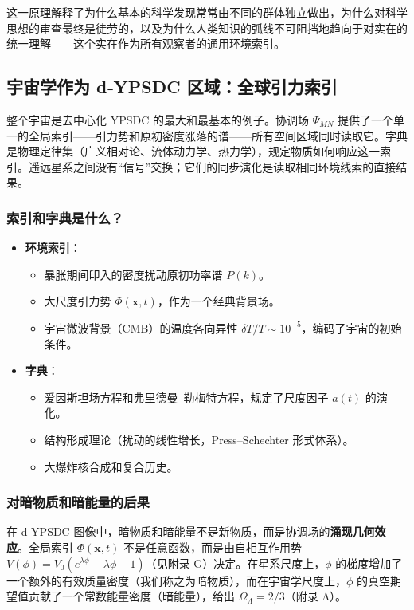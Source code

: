 \documentclass[11pt,a4paper]{article}
\begin{document}
	这一原理解释了为什么基本的科学发现常常由不同的群体独立做出，为什么对科学思想的审查最终是徒劳的，以及为什么人类知识的弧线不可阻挡地趋向于对实在的统一理解——这个实在作为所有观察者的通用环境索引。
	
	\subsection{宇宙学作为 d‑YPSDC 区域：全球引力索引}
	\label{subsec:cosmology-dypsdc}
	
	整个宇宙是去中心化 YPSDC 的最大和最基本的例子。协调场 \(\Psi_{MN}\) 提供了一个单一的全局索引——引力势和原初密度涨落的谱——所有空间区域同时读取它。字典是物理定律集（广义相对论、流体动力学、热力学），规定物质如何响应这一索引。遥远星系之间没有“信号”交换；它们的同步演化是读取相同环境线索的直接结果。
	
	\subsubsection*{索引和字典是什么？}
	\begin{itemize}[leftmargin=*]
		\item \textbf{环境索引}：
		\begin{itemize}
			\item 暴胀期间印入的密度扰动原初功率谱 \(P(k)\)。
			\item 大尺度引力势 \(\Phi(\mathbf{x},t)\)，作为一个经典背景场。
			\item 宇宙微波背景（CMB）的温度各向异性 \(\delta T / T \sim 10^{-5}\)，编码了宇宙的初始条件。
		\end{itemize}
		\item \textbf{字典}：
		\begin{itemize}
			\item 爱因斯坦场方程和弗里德曼–勒梅特方程，规定了尺度因子 \(a(t)\) 的演化。
			\item 结构形成理论（扰动的线性增长，Press–Schechter 形式体系）。
			\item 大爆炸核合成和复合历史。
		\end{itemize}
	\end{itemize}
	
	\subsubsection*{对暗物质和暗能量的后果}
	在 d‑YPSDC 图像中，暗物质和暗能量不是新物质，而是协调场的\textbf{涌现几何效应}。全局索引 \(\Phi(\mathbf{x},t)\) 不是任意函数，而是由自相互作用势 \(V(\phi) = V_0 (e^{\lambda \phi} - \lambda \phi - 1)\)（见附录 G）决定。在星系尺度上，\(\phi\) 的梯度增加了一个额外的有效质量密度（我们称之为暗物质），而在宇宙学尺度上，\(\phi\) 的真空期望值贡献了一个常数能量密度（暗能量），给出 \(\Omega_\Lambda = 2/3\)（附录 Λ）。
	
\end{document}
